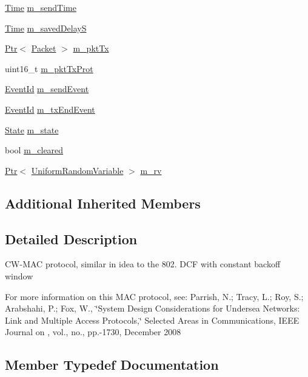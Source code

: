 \begin{DoxyCompactItemize}
\hyperlink{classns3_1_1Time}{Time} \hyperlink{classns3_1_1UanMacCw_a055cbef7661203850c3842684015b76a}{m\+\_\+send\+Time}
\item 
\hyperlink{classns3_1_1Time}{Time} \hyperlink{classns3_1_1UanMacCw_ad33eeb167802beb8d58a53149973d801}{m\+\_\+saved\+DelayS}
\item 
\hyperlink{classns3_1_1Ptr}{Ptr}$<$ \hyperlink{classns3_1_1Packet}{Packet} $>$ \hyperlink{classns3_1_1UanMacCw_a172da34ee7c04174ede573f71f04895f}{m\+\_\+pkt\+Tx}
\item 
uint16\+\_\+t \hyperlink{classns3_1_1UanMacCw_aecae266cc09d3efd3a79103bda2710f3}{m\+\_\+pkt\+Tx\+Prot}
\item 
\hyperlink{classns3_1_1EventId}{Event\+Id} \hyperlink{classns3_1_1UanMacCw_aaec3d67f48da09675c7160b6f0b8f310}{m\+\_\+send\+Event}
\item 
\hyperlink{classns3_1_1EventId}{Event\+Id} \hyperlink{classns3_1_1UanMacCw_a5f78b44fb27bb8f0cdc701bca775f981}{m\+\_\+tx\+End\+Event}
\item 
\hyperlink{classns3_1_1UanMacCw_ac5de94c1ba7689bee84413babfe604af}{State} \hyperlink{classns3_1_1UanMacCw_a577ccecc9cde62c54f3dd37f60ac5165}{m\+\_\+state}
\item 
bool \hyperlink{classns3_1_1UanMacCw_a28eea3461bb56e7acd79ecb258e8daf8}{m\+\_\+cleared}
\item 
\hyperlink{classns3_1_1Ptr}{Ptr}$<$ \hyperlink{classns3_1_1UniformRandomVariable}{Uniform\+Random\+Variable} $>$ \hyperlink{classns3_1_1UanMacCw_a5b41287415a347117aeb966f6b1a389c}{m\+\_\+rv}
\end{DoxyCompactItemize}
\subsection*{Additional Inherited Members}


\subsection{Detailed Description}
C\+W-\/\+M\+AC protocol, similar in idea to the 802. D\+CF with constant backoff window

For more information on this M\+AC protocol, see\+: Parrish, N.; Tracy, L.; Roy, S.; Arabshahi, P.; Fox, W., \char`\"{}\+System Design Considerations for Undersea Networks\+: Link and
\+Multiple Access Protocols,\char`\"{} Selected Areas in Communications, I\+E\+EE Journal on , vol., no., pp.-\/1730, December 2008 

\subsection{Member Typedef Documentation}
